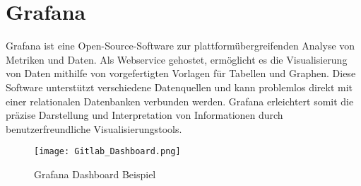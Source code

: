 \section{Grafana}
Grafana ist eine Open-Source-Software zur plattformübergreifenden Analyse von Metriken und Daten. Als Webservice gehostet, ermöglicht es die Visualisierung von Daten mithilfe von vorgefertigten Vorlagen für Tabellen und Graphen. Diese Software unterstützt verschiedene Datenquellen und kann problemlos direkt mit einer relationalen Datenbanken verbunden werden. Grafana erleichtert somit die präzise Darstellung und Interpretation von Informationen durch benutzerfreundliche Visualisierungstools. \cite{GrafanaWebsite}\\
\vspace{-1cm}
\begin{center}
    \begin{figure}[h]
     \centering
     \texttt{[image: Gitlab\_Dashboard.png]}
     \caption{Grafana Dashboard Beispiel \cite{GrafanaWebsite}}
     \label{fig:FuzzyLogicArchitektur}
    \end{figure}
   \end{center}
